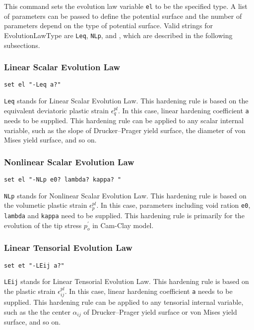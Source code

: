 This  command sets the evolution law variable \texttt{el} to be
the  specified  type.  A  list  of  parameters can be passed to
define  the  potential  surface  and  the  number of parameters
depend  on  the  type  of  potential surface. Valid strings for
EvolutionLawType are \texttt{Leq}, \texttt{NLp}, and \texttt{},
which are described in the following subsections.

\subsubsection{Linear Scalar Evolution Law} 
\label{leq_el}
\begin{verbatim}
set el "-Leq a?"
\end{verbatim}

\texttt{Leq}  stands  for  Linear  Scalar  Evolution  Law. This
hardening  rule  is  based on the equivalent deviatoric plastic
strain $\epsilon_q^{pl}$. In this case, linear hardening coefficient
\texttt{a}  needs  to  be  supplied. This hardening rule can be
applied  to  any scalar internal variable, such as the slope of
Drucker--Prager  yield  surface, the diameter of von Mises yield
surface, and so on.

\subsubsection{Nonlinear Scalar Evolution Law} 
\label{nlp_el}

\begin{verbatim}
set el "-NLp e0? lambda? kappa? "
\end{verbatim}

\texttt{NLp}  stands  for  Nonlinear Scalar Evolution Law. This
hardening  rule  is  based  on  the  volumetic  plastic  strain
$\epsilon_p^{pl}$.  In  this  case, parameters including void ration
\texttt{e0},  \texttt{lambda} and  \texttt{kappa}  need   to  be  supplied. This
hardening rule is primarily for the evolution of the tip stress
$p^{'}_{o}$ in Cam-Clay model.

\subsubsection{Linear Tensorial Evolution Law} 
\label{LEij}
\begin{verbatim}
set et "-LEij a?"
\end{verbatim}

\texttt{LEij}  stands  for  Linear Tensorial Evolution Law. This
hardening    rule    is    based    on   the   plastic   strain
$\epsilon_{ij}^{pl}$. In this case, linear hardening
coefficient  \texttt{a}  needs  to  be supplied. This hardening
rule can be applied to any tensorial internal variable, such as
the  the  center  $\alpha_{ij}$ of Drucker--Prager yield surface
or von Mises yield surface, and so on.

